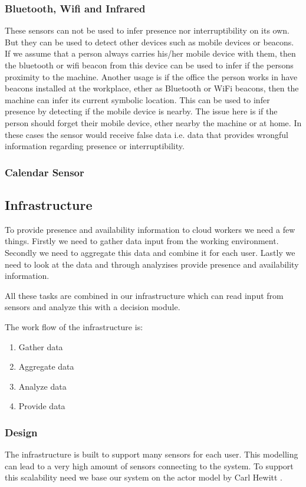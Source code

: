 \documentclass{sigchi}
\begin{document}
\subsubsection{Bluetooth, Wifi and Infrared}
These sensors can not be used to infer presence nor interruptibility on its own.
But they can be used to detect other devices such as mobile devices or beacons.
If we assume that a person always carries his/her mobile device with them, then the bluetooth or wifi beacon from this device can be used to infer if the persons proximity to the machine.
Another usage is if the office the person works in have beacons installed at the workplace, ether as Bluetooth or WiFi beacons, then the machine can infer its current symbolic location.
This can be used to infer presence by detecting if the mobile device is nearby.
The issue here is if the person should forget their mobile device, ether nearby the machine or at home.
In these cases the sensor would receive false data i.e. data that provides wrongful information regarding presence or interruptibility.

\subsubsection{Calendar Sensor}

\subsection{Infrastructure}
To provide presence and availability information to cloud workers we need a few things.
Firstly we need to gather data input from the working environment.
Secondly we need to aggregate this data and combine it for each user.
Lastly we need to look at the data and through analyzises provide presence and availability information.

All these tasks are combined in our infrastructure which can read input from sensors and analyze this with a decision module.

The work flow of the infrastructure is:
\begin{enumerate}
  \item Gather data
  \item Aggregate data
  \item Analyze data
  \item Provide data
\end{enumerate}

\subsubsection{Design}
The infrastructure is built to support many sensors for each user.
This modelling can lead to a very high amount of sensors connecting to the system.
To support this scalability need we base our system on the actor model by Carl Hewitt \cite{hewitt1973universal}.
\end{document}
